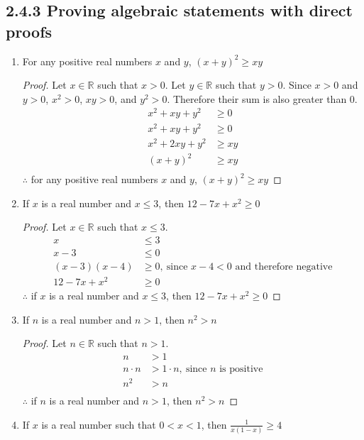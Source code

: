 \documentclass{article}
\newcommand{\bld}{\textbf}
\newcommand{\bb}{\mathbb}
\newcommand{\bitem}[1]{\item[\bld{#1.}]}
\begin{document}
\subsection*{2.4.3 Proving algebraic statements with direct proofs}
\begin{enumerate}
  \bitem{a} For any positive real numbers $x$ and $y$, $(x+y)^2 \geq xy$
  \begin{proof}
    Let $x \in \bb{R}$ such that $x > 0$. Let $y \in \bb{R}$ such that $y > 0$.
    Since $x > 0$ and $y > 0$, $x^2 > 0$, $xy > 0$, and $y^2 > 0$. Therefore their sum is also greater than $0$.
    \begin{align*}
      x^2 + xy + y^2  & \geq 0  \\
      x^2 + xy + y^2  & \geq 0  \\
      x^2 + 2xy + y^2 & \geq xy \\
      (x+y)^2         & \geq xy \\
    \end{align*}
    $\therefore$ for any positive real numbers $x$ and $y$, $(x+y)^2 \geq xy$
  \end{proof}
  \bitem{b} If $x$ is a real number and $x \leq 3$, then $12 - 7x + x^2 \geq 0$
  \begin{proof}
    Let $x \in \bb{R}$ such that $x \leq 3$.
    \begin{align*}
      x             & \leq 3                                                \\
      x-3           & \leq 0                                                \\
      (x-3)(x-4)    & \geq 0,~\text{since $x-4 < 0$ and therefore negative} \\
      12 - 7x + x^2 & \geq 0
    \end{align*}
    $\therefore$ if $x$ is a real number and $x \leq 3$, then $12 - 7x + x^2 \geq 0$
  \end{proof}
  \bitem{c} If $n$ is a real number and $n > 1$, then $n^2 > n$
  \begin{proof}
    Let $n \in \bb{R}$ such that $n > 1$.
    \begin{align*}
      n         & > 1                                       \\
      n \cdot n & > 1 \cdot n,~\text{since $n$ is positive} \\
      n^2       & > n                                       \\
    \end{align*}
    $\therefore$ if $n$ is a real number and $n > 1$, then $n^2 > n$
  \end{proof}
  \bitem{d} If $x$ is a real number such that $0 < x < 1$, then $\frac{1}{x(1-x)} \geq 4$
\end{enumerate}
\end{document}
